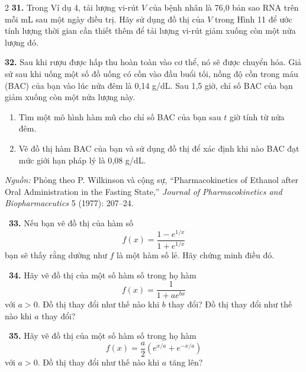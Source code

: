 \begin{multicols}{2}
\noindent\textbf{31.} Trong Ví dụ 4, tải lượng vi-rút $V$ của bệnh nhân là 76,0 bản sao RNA trên mỗi mL sau một ngày điều trị. Hãy sử dụng đồ thị của $V$ trong Hình 11 để ước tính lượng thời gian cần thiết thêm để tải lượng vi-rút giảm xuống còn một nửa lượng đó.

\noindent\textbf{32.} Sau khi rượu được hấp thu hoàn toàn vào cơ thể, nó sẽ được chuyển hóa. Giả sử sau khi uống một số đồ uống có cồn vào đầu buổi tối, nồng độ cồn trong máu (BAC) của bạn vào lúc nửa đêm là 0,14 g/dL. Sau 1,5 giờ, chỉ số BAC của bạn giảm xuống còn một nửa lượng này.
\begin{enumerate}[label=(\alph*),leftmargin=1.5em,itemsep=1pt,topsep=1pt]
    \item Tìm một mô hình hàm mũ cho chỉ số BAC của bạn sau $t$ giờ tính từ nửa đêm.
    \item[\graphsymbol\ (b)] Vẽ đồ thị hàm BAC của bạn và sử dụng đồ thị để xác định khi nào BAC đạt mức giới hạn pháp lý là 0,08 g/dL.
\end{enumerate}
\vspace{1pt}
{\fontsize{7.5pt}{9.5pt}\selectfont\textit{Nguồn:} Phỏng theo P. Wilkinson và cộng sự, ``Pharmacokinetics of Ethanol after Oral Administration in the Fasting State,'' \textit{Journal of Pharmacokinetics and Biopharmaceutics} 5 (1977): 207--24.\par}

\noindent\graphsymbol\ \textbf{33.} Nếu bạn vẽ đồ thị của hàm số
\[
f(x) = \frac{1 - e^{1/x}}{1 + e^{1/x}}
\]
bạn sẽ thấy rằng dường như $f$ là một hàm số lẻ. Hãy chứng minh điều đó.

\noindent\graphsymbol\ \textbf{34.} Hãy vẽ đồ thị của một số hàm số trong họ hàm
\[
f(x) = \frac{1}{1 + ae^{bx}}
\]
với $a > 0$. Đồ thị thay đổi như thế nào khi $b$ thay đổi? Đồ thị thay đổi như thế nào khi $a$ thay đổi?

\noindent\graphsymbol\ \textbf{35.} Hãy vẽ đồ thị của một số hàm số trong họ hàm
\[
f(x) = \frac{a}{2}\left(e^{x/a} + e^{-x/a}\right)
\]
với $a > 0$. Đồ thị thay đổi như thế nào khi $a$ tăng lên?

\end{multicols}